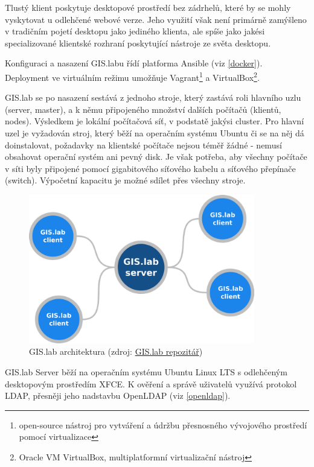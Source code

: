 Tlustý klient poskytuje desktopové prostředí bez zádrhelů, které by se
mohly vyskytovat u odlehčené webové verze. Jeho využití však není primárně
zamýšleno v tradičním pojetí desktopu jako jediného klienta, ale spíše
jako jakési specializované klientské rozhraní poskytující nástroje ze
světa desktopu.

Konfiguraci a nasazení GIS.labu řídí platforma Ansible (viz \ref{docker}). Deployment ve
virtuálním režimu umožňuje Vagrant\footnote{open-source nástroj pro vytváření a údržbu přesnosného vývojového prostředí pomocí virtualizace} a VirtualBox\footnote{Oracle VM VirtualBox, multiplatformní virtualizační nástroj}.

GIS.lab se po nasazení sestává z jednoho stroje, který zastává roli
hlavního uzlu (server, master), a k němu připojeného množství dalších počítačů
(klientů, nodes). Výsledkem je lokální počítačová síť, v podstatě jakýsi cluster.
Pro hlavní uzel je vyžadován stroj, který běží na operačním systému
Ubuntu či se na něj dá doinstalovat, požadavky na klientské počítače nejsou téměř žádné - nemusí
obsahovat operační systém ani pevný disk. Je však potřeba, aby všechny
počítače v síti byly připojené pomocí gigabitového síťového kabelu a
síťového přepínače (switch). Výpočetní kapacitu je možné sdílet přes všechny stroje.

\begin{figure}[H] \centering
    \includegraphics[width=280pt]{./pictures/gislab-architecture.png}
    \caption[GIS.lab architektura]{GIS.lab architektura (zdroj:
	\href{https://github.com/gislab-npo/gislab-doc/blob/master/img/general/gislab-architecture.png}{GIS.lab repozitář})}
	\label{fig:gislab-architecture}
\end{figure}

GIS.lab Server běží na operačním systému Ubuntu Linux LTS s odlehčeným desktopovým prostředím XFCE. 
K ověření a správě uživatelů využívá protokol LDAP, přesněji jeho nadstavbu OpenLDAP (viz \ref{openldap}). 

